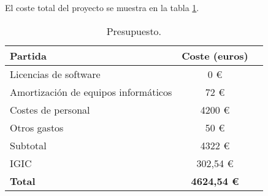 El coste total del proyecto se muestra en la tabla \ref{tab:presupuesto}.
\begin{table}[H]
	\centering
	\small
	\begin{tabular}{|l|c|r|}
		\hline
		\textbf{Partida}                     & \textbf{Coste (euros)} \\
		\hline
		Licencias de software                & 0 €                    \\ \hline
		Amortización de equipos informáticos & 72 €                   \\ \hline
		Costes de personal                   & 4200 €                 \\ \hline
		Otros gastos                         & 50 €                   \\ \hline \hline
		Subtotal                             & 4322 €                 \\ \hline
		IGIC                                 & 302,54 €               \\ \hline \hline
		\textbf{Total}                       & \textbf{4624,54 €}     \\
		\hline
	\end{tabular}
	\caption{Presupuesto.}
	\label{tab:presupuesto}
\end{table}
